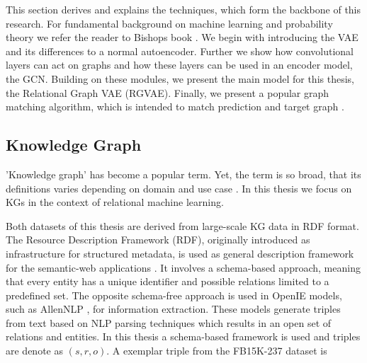 

This section derives and explains the techniques, which form the backbone of this research. For fundamental background on machine learning and probability theory we refer the reader to Bishops book \cite{bishop_pattern_2006}. We begin with introducing the VAE and its differences to a normal autoencoder. Further we show how convolutional layers can act on graphs and how these layers can be used in an encoder model, the GCN. Building on these modules, we present the main model for this thesis, the Relational Graph VAE (RGVAE). Finally, we present a popular graph matching algorithm, which is intended to match prediction and target graph \cite{paulheim_knowledge_2016}.  


\subsection{Knowledge Graph}

'Knowledge graph' has become a popular term. Yet, the term is so broad, that its definitions varies depending on domain and use case \cite{ehrlinger2016towards}. In this thesis we focus on KGs in the context of relational machine learning.

Both datasets of this thesis are derived from large-scale KG data in RDF format. The Resource Description Framework (RDF), originally introduced as infrastructure for structured metadata, is used as general description framework for the semantic-web applications \cite{miller1998introduction}. It involves a schema-based approach, meaning that every entity has a unique identifier and possible relations limited to a predefined set. The opposite schema-free approach is used in OpenIE models, such as AllenNLP \cite{gardner_allennlp_2018}, for information extraction. These models generate triples from text based on NLP parsing techniques which results in an open set of relations and entities. In this thesis a schema-based framework is used and triples are denote as $(s,r,o)$. A exemplar triple from the FB15K-237 dataset is


